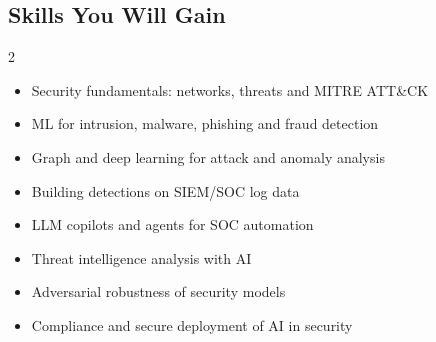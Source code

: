 \documentclass[10pt,a4paper]{article}
\begin{document}
\subsection*{Skills You Will Gain}\begin{multicols}{2}\begin{itemize}\small
\item Security fundamentals: networks, threats and MITRE ATT\&CK
\item ML for intrusion, malware, phishing and fraud detection
\item Graph and deep learning for attack and anomaly analysis
\item Building detections on SIEM/SOC log data
\item LLM copilots and agents for SOC automation
\item Threat intelligence analysis with AI
\item Adversarial robustness of security models
\item Compliance and secure deployment of AI in security
\end{itemize}\end{multicols}
\end{document}
